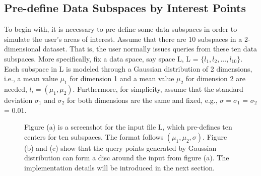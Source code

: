 \documentclass{lmproj}
\begin{document}
\subsection{Pre-define Data Subspaces by Interest Points}
To begin with, it is necessary to pre-define some data subspaces in order to simulate the user's areas of interest. Assume that there are 10 subspaces in a 2-dimensional dataset. That is, the user normally issues queries from these ten data subspaces. More specifically, fix a data space, say space L, L = $ \{l_1,l_2, ..., l_{10}\} $. Each subspace in L is modeled through a Gaussian distribution of 2 dimensions, i.e., a mean value $ \mu_1 $ for dimension 1 and a mean value $ \mu_2 $  for dimension 2 are needed, $ l_i= (\mu_1,\mu_2) $. Furthermore, for simplicity, assume that the standard deviation  $ \sigma_1 $  and $ \sigma_2 $ for both dimensions are the same and fixed, e.g., $ \sigma = \sigma_1 $ = $ \sigma_2 $ = 0.01. 

\begin{figure}

Figure (a) is a screenshot for the input file L, which pre-defines ten centers for ten subspaces. The format follows $ (\mu_1,\mu_2,\sigma) $. Figure (b) and (c) show that the query points generated by Gaussian distribution can form a disc around the input from figure (a). The implementation details will be introduced in the next section.
\end{figure}
\end{document}
